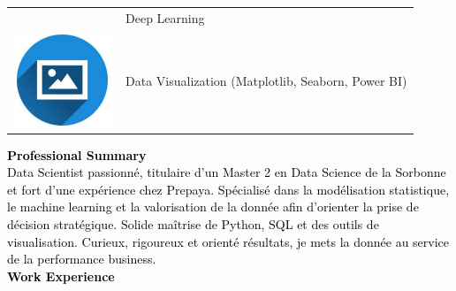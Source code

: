 \documentclass{article}
\begin{document}
\begin{paracol}{2}
\begin{tabular}{ll}
\begin{minipage}{0.1\linewidth}
         \end{minipage} & {Deep Learning} \\[10pt]
         \begin{minipage}{0.1\linewidth}
         \includegraphics[width=\linewidth]{picon.png}
         \end{minipage} & {Data Visualization (Matplotlib, Seaborn, Power BI)} \\[10pt]
        \end{tabular}
        
\switchcolumn
\color{black}

\textcolor{black}{\Large \textbf{Professional Summary}} \\

\textcolor{black}{Data Scientist passionné, titulaire d’un Master 2 en Data Science de la Sorbonne et fort d’une expérience chez Prepaya. Spécialisé dans la modélisation statistique, le machine learning et la valorisation de la donnée afin d’orienter la prise de décision stratégique. Solide maîtrise de Python, SQL et des outils de visualisation. Curieux, rigoureux et orienté résultats, je mets la donnée au service de la performance business.}\\[8pt]

\textcolor{black}{\Large \textbf{Work Experience}} \\


\end{paracol}
\end{document}
